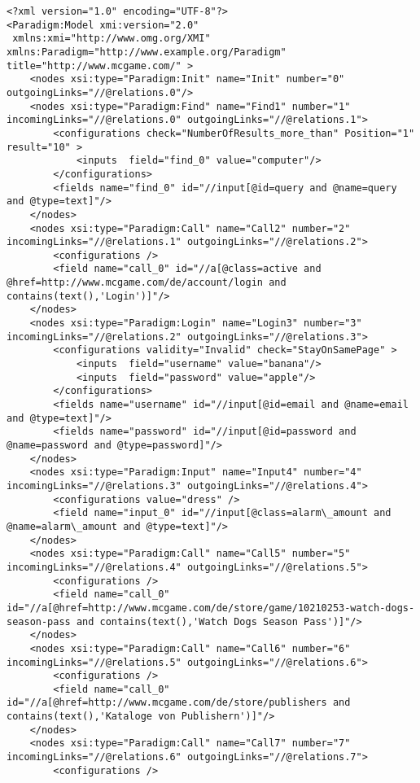 \begin{lstlisting}
<?xml version="1.0" encoding="UTF-8"?>
<Paradigm:Model xmi:version="2.0"
 xmlns:xmi="http://www.omg.org/XMI" xmlns:Paradigm="http://www.example.org/Paradigm"
title="http://www.mcgame.com/" >
	<nodes xsi:type="Paradigm:Init" name="Init" number="0" outgoingLinks="//@relations.0"/>
	<nodes xsi:type="Paradigm:Find" name="Find1" number="1" incomingLinks="//@relations.0" outgoingLinks="//@relations.1">
		<configurations check="NumberOfResults_more_than" Position="1" result="10" >
			<inputs  field="find_0" value="computer"/>
		</configurations>
		<fields name="find_0" id="//input[@id=query and @name=query and @type=text]"/>
	</nodes>
	<nodes xsi:type="Paradigm:Call" name="Call2" number="2" incomingLinks="//@relations.1" outgoingLinks="//@relations.2">
		<configurations />
		<field name="call_0" id="//a[@class=active and @href=http://www.mcgame.com/de/account/login and contains(text(),'Login')]"/>
	</nodes>
	<nodes xsi:type="Paradigm:Login" name="Login3" number="3" incomingLinks="//@relations.2" outgoingLinks="//@relations.3">
		<configurations validity="Invalid" check="StayOnSamePage" >
			<inputs  field="username" value="banana"/>
			<inputs  field="password" value="apple"/>
		</configurations>
		<fields name="username" id="//input[@id=email and @name=email and @type=text]"/>
		<fields name="password" id="//input[@id=password and @name=password and @type=password]"/>
	</nodes>
	<nodes xsi:type="Paradigm:Input" name="Input4" number="4" incomingLinks="//@relations.3" outgoingLinks="//@relations.4">
		<configurations value="dress" />
		<field name="input_0" id="//input[@class=alarm\_amount and @name=alarm\_amount and @type=text]"/>
	</nodes>
	<nodes xsi:type="Paradigm:Call" name="Call5" number="5" incomingLinks="//@relations.4" outgoingLinks="//@relations.5">
		<configurations />
		<field name="call_0" id="//a[@href=http://www.mcgame.com/de/store/game/10210253-watch-dogs-season-pass and contains(text(),'Watch Dogs Season Pass')]"/>
	</nodes>
	<nodes xsi:type="Paradigm:Call" name="Call6" number="6" incomingLinks="//@relations.5" outgoingLinks="//@relations.6">
		<configurations />
		<field name="call_0" id="//a[@href=http://www.mcgame.com/de/store/publishers and contains(text(),'Kataloge von Publishern')]"/>
	</nodes>
	<nodes xsi:type="Paradigm:Call" name="Call7" number="7" incomingLinks="//@relations.6" outgoingLinks="//@relations.7">
		<configurations />

\end{lstlisting}
